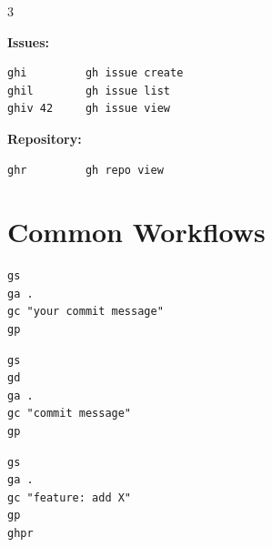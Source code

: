 \documentclass[11pt,landscape]{article}
\begin{document}
\begin{multicols}{3}
\vspace{6pt}

\textbf{Issues:}
\begin{Verbatim}[fontsize=\normalsize,frame=single]
ghi         gh issue create
ghil        gh issue list
ghiv 42     gh issue view
\end{Verbatim}

\textbf{Repository:}
\begin{Verbatim}[fontsize=\normalsize,frame=single]
ghr         gh repo view
\end{Verbatim}

\columnbreak

\section*{Common Workflows}

\begin{tcolorbox}[colback=highlightbg,colframe=commandcolor,boxrule=1.5pt,arc=2pt,left=8pt,right=8pt,top=6pt,bottom=6pt,title={\large\textbf{1. Quick Commit \& Push}}]
\begin{Verbatim}[fontsize=\Large,frame=none]
gs
ga .
gc "your commit message"
gp
\end{Verbatim}
\end{tcolorbox}

\vspace{6pt}

\begin{tcolorbox}[colback=highlightbg,colframe=commandcolor,boxrule=1.5pt,arc=2pt,left=8pt,right=8pt,top=6pt,bottom=6pt,title={\large\textbf{2. Review Before Push}}]
\begin{Verbatim}[fontsize=\Large,frame=none]
gs
gd
ga .
gc "commit message"
gp
\end{Verbatim}
\end{tcolorbox}

\vspace{6pt}

\begin{tcolorbox}[colback=highlightbg,colframe=commandcolor,boxrule=1.5pt,arc=2pt,left=8pt,right=8pt,top=6pt,bottom=6pt,title={\large\textbf{3. Create Pull Request}}]
\begin{Verbatim}[fontsize=\Large,frame=none]
gs
ga .
gc "feature: add X"
gp
ghpr
\end{Verbatim}
\end{tcolorbox}

\vspace{6pt}


\end{multicols}
\end{document}
